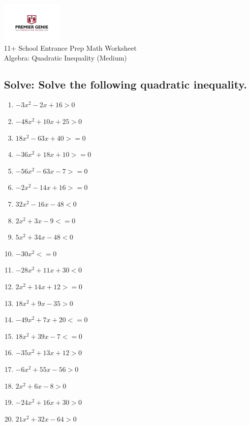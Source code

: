 \documentclass{article}
\begin{document}
\begin{center}
\includegraphics[width=3cm]{PREMGENIEJPG.jpg}\\
{\Large 11+ School Entrance Prep Math Worksheet}\\
{\Medium Algebra: Quadratic Inequality (Medium)}\\

\end{center}

\subsection*{Solve: Solve the following quadratic inequality.}

\begin{enumerate}
\item $\displaystyle - 3 x^{2} - 2 x + 16>0 $ \ 
\item $\displaystyle - 48 x^{2} + 10 x + 25>0 $ \ 
\item $\displaystyle 18 x^{2} - 63 x + 40>=0 $ \ 
\item $\displaystyle - 36 x^{2} + 18 x + 10>=0 $ \ 
\item $\displaystyle - 56 x^{2} - 63 x - 7>=0 $ \ 
\item $\displaystyle - 2 x^{2} - 14 x + 16>=0 $ \ 
\item $\displaystyle 32 x^{2} - 16 x - 48<0 $ \ 
\item $\displaystyle 2 x^{2} + 3 x - 9<=0 $ \ 
\item $\displaystyle 5 x^{2} + 34 x - 48<0 $ \ 
\item $\displaystyle - 30 x^{2}<=0 $ \ 
\item $\displaystyle - 28 x^{2} + 11 x + 30<0 $ \ 
\item $\displaystyle 2 x^{2} + 14 x + 12>=0 $ \ 
\item $\displaystyle 18 x^{2} + 9 x - 35>0 $ \ 
\item $\displaystyle - 49 x^{2} + 7 x + 20<=0 $ \ 
\item $\displaystyle 18 x^{2} + 39 x - 7<=0 $ \ 
\item $\displaystyle - 35 x^{2} + 13 x + 12>0 $ \ 
\item $\displaystyle - 6 x^{2} + 55 x - 56>0 $ \ 
\item $\displaystyle 2 x^{2} + 6 x - 8>0 $ \ 
\item $\displaystyle - 24 x^{2} + 16 x + 30>0 $ \ 
\item $\displaystyle 21 x^{2} + 32 x - 64>0 $ \ 


\end{enumerate}
\end{document}
